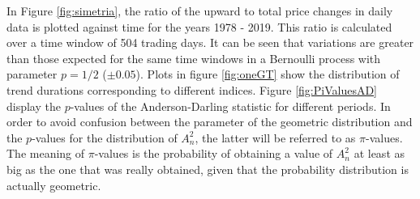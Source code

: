 \documentclass[a4paper]{jpconf}
\begin{document}
In Figure \ref{fig:simetria}, the ratio of the upward to total price changes in daily data is plotted against time for the years 1978 - 2019. This ratio is calculated over a time window of 504 trading days. It can be seen that variations are greater than those expected for the same time windows in a Bernoulli process with parameter $p = 1/2$ ($\pm{0.05}$). Plots in figure \ref{fig:oneGT} show the distribution of trend durations corresponding to different indices. Figure \ref{fig:PiValuesAD} display the $p$-values of the Anderson-Darling statistic for different periods. In order to avoid confusion between the parameter of the geometric distribution and the $p$-values for the distribution of $A^{2}_{n}$, the latter will be referred to as $\pi$-values. The meaning of $\pi$-values is the probability of obtaining a value of $A^{2}_{n}$ at least as big as the one that was really obtained, given that the probability distribution is actually geometric.
\end{document}
